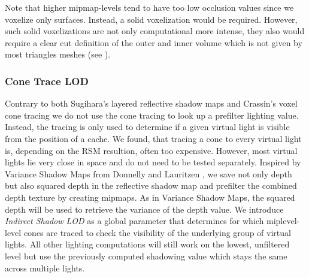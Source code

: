 \documentclass[thesis.tex]{subfiles}
\begin{document}
Note that higher mipmap-levels tend to have too low occlusion values since we voxelize only surfaces.
Instead, a solid voxelization would be required.
However, such solid voxelizations are not only computational more intense, they also would require a clear cut definition of the outer and inner volume which is not given by most triangles meshes (see ).

\subsubsection{Cone Trace LOD}
Contrary to both Sugihara's layered reflective shadow maps and Crassin's voxel cone tracing we do not use the cone tracing to look up a prefilter lighting value.
Instead, the tracing is only used to determine if a given virtual light is visible from the position of a cache.
We found, that tracing a cone to every virtual light is, depending on the RSM resultion, often too expensive.
However, most virtual lights lie very close in space and do not need to be tested separately.
Inspired by Variance Shadow Maps from Donnelly and Lauritzen \cite{bib:vsm}, we save not only depth but also squared depth in the reflective shadow map and prefilter the combined depth texture by creating mipmaps.
As in Variance Shadow Maps, the squared depth will be used to retrieve the variance of the depth value.
We introduce \emph{Indirect Shadow LOD} as a global parameter that determines for which miplevel-level cones are traced to check the visibility of the underlying group of virtual lights. 
All other lighting computations will still work on the lowest, unfiltered level but use the previously computed shadowing value which stays the same across multiple lights.\\
\end{document}

